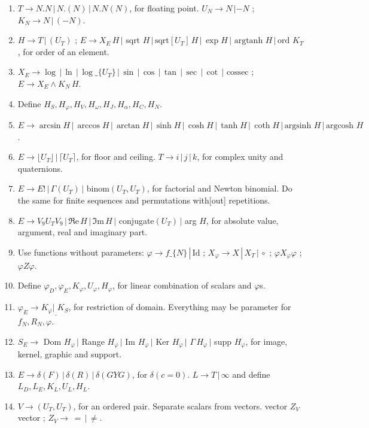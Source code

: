 \documentclass[11pt,a4paper]{article}
\newenvironment{myenum}
{ \begin{enumerate}
    \setlength{\itemsep}{0pt}
    \setlength{\parskip}{0pt}
    \setlength{\parsep}{0pt}     }
{ \end{enumerate}                  }
\begin{document}
\begin{myenum}
		group\_element $W \wedge\,K_N$ ; $\infty\wedge K_N$.
		\item $T \rightarrow N.N\,|\,N.(N)\,|\,N.N(N)$, for floating point. $U_N \rightarrow N\,|-N$ ; $K_N \rightarrow N\,|\,(-N)$.
		\item $H \rightarrow T\,|\,(U_T)$ ; $E \rightarrow X_E\,H\,|\text{ sqrt }H\,|\,\text{sqrt}[U_T]\,H\,|\,\exp H\,|\text{ argtanh }H\,|\,\text{ord }K_T$, for order of an element.
		\item $X_E \rightarrow \log\,|\,\ln\,|\,\log\_\{U_T\}\,|\,\sin\,|\,\cos\,|\,\tan\,|\,\sec\,|\,\cot\,|\text{ cossec}$ ; $E \rightarrow X_E\wedge K_N\,H$.
		\item Define $H_S, H_\varphi, H_V, H_\omega, H_J, H_\alpha, H_C, H_N$.
		\item $E \rightarrow \arcsin H\,|\,\arccos H\,|\,\arctan H\,|\,\sinh H\,|\,\cosh H\,|\,\tanh H\,|\,\coth H\,|\,\text{argsinh }H\,|\,\text{argcosh }H$.
		\item $E \rightarrow \lfloor U_T \rfloor\,|\, \lceil U_T \rceil$, for floor and ceiling. $T \rightarrow i\,|\,j\,|\,k$, for complex unity and quaternions.
		\item $E \rightarrow E!\,|\,\Gamma(U_T)\,|$ binom$(U_T, U_T)$, for factorial and Newton binomial. Do the same for finite sequences and permutations with[out] repetitions.
		\item $E \rightarrow V_9U_TV_9\,|\,\Re\text{e}\,H\,|\,\Im\text{m}\,H\,|$ conjugate$(U_T)\,|$ arg $H$, for absolute value, argument, real and imaginary part.
		\item Use functions without parameters: $\varphi \rightarrow f\_\{N\}\,|\,\text{Id };\,X_\varphi \rightarrow X\,|\,X_T\,|\,\circ$ ; $\varphi X_\varphi \varphi$ ; $\varphi Z \varphi$.
		\item Define $\varphi_D, \varphi_E, K_\varphi, U_\varphi, H_\varphi$, for linear combination of scalars and $\varphi$s.
		\item $\varphi_E \rightarrow K_\varphi|_\_{K_S}$, for restriction of domain. Everything may be parameter for $f_N, R_N, \varphi$.
		\item $S_E \rightarrow$ Dom $H_\varphi\,|$ Range $H_\varphi\,|$ Im $H_\varphi\,|$ Ker $H_\varphi\,|$ $\Gamma\,H_\varphi\,|$ supp $H_\varphi$, for image, kernel, graphic and support.
		\item $E \rightarrow \delta(F)\,|\,\delta(R)\,|\,\delta(GYG)$, for $\delta(c = 0)$. $L \rightarrow T\,|\,\infty$ and define $L_D, L_E, K_L, U_L, H_L$.
		\item $V \rightarrow (U_T, U_T)$, for an ordered pair. Separate scalars from vectors. vector $Z_V$ vector ; $Z_V \rightarrow\,=\,|\,\ne$.

\end{myenum}
\end{document}
